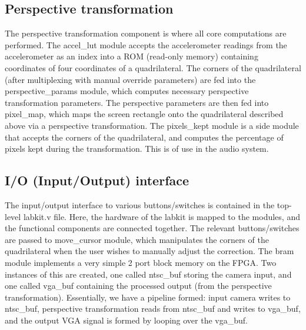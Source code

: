 \documentclass{article}
\begin{document}
\subsection{Perspective transformation}
The perspective transformation component is where all core computations are performed.
The accel\_lut module accepts the accelerometer readings from the accelerometer as an index into a ROM (read-only memory) containing coordinates of four coordinates of a quadrilateral.
The corners of the quadrilateral (after multiplexing with manual override parameters) are fed into the perspective\_params module, which computes necessary perspective transformation parameters.
The perspective parameters are then fed into pixel\_map, which maps the screen rectangle onto the quadrilateral described above via a perspective transformation.
The pixels\_kept module is a side module that accepts the corners of the quadrilateral, and computes the percentage of pixels kept during the transformation.
This is of use in the audio system.

\subsection{I/O (Input/Output) interface}
The input/output interface to various buttons/switches is contained in the top-level labkit.v file.
Here, the hardware of the labkit is mapped to the modules, and the functional components are connected together.
The relevant buttons/switches are passed to move\_cursor module, which manipulates the corners of the quadrilateral when the user wishes to manually adjust the correction.
The bram module implements a very simple 2 port block memory on the FPGA.
Two instances of this are created, one called ntsc\_buf storing the camera input, and one called vga\_buf containing the processed output (from the perspective transformation).
Essentially, we have a pipeline formed:
input camera writes to ntsc\_buf, perspective transformation reads from ntsc\_buf and writes to vga\_buf, and the output VGA signal is formed by looping over the vga\_buf.
\end{document}
